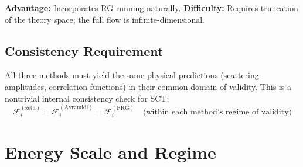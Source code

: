 \documentclass[11pt,a4paper]{article}
\begin{document}
\textbf{Advantage:} Incorporates RG running naturally. \textbf{Difficulty:} Requires truncation of the theory space; the full flow is infinite-dimensional.

\subsection{Consistency Requirement}

All three methods must yield the same physical predictions (scattering amplitudes, correlation functions) in their common domain of validity. This is a nontrivial internal consistency check for SCT:
\begin{equation}
  \mathcal{F}_i^{(\text{zeta})} = \mathcal{F}_i^{(\text{Avramidi})} = \mathcal{F}_i^{(\text{FRG})}
  \quad \text{(within each method's regime of validity)}
\end{equation}

\section{Energy Scale and Regime}
\end{document}
